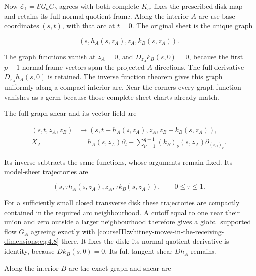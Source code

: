 Now \(\mathcal E_1=\mathcal E G_aG_b\) agrees with both complete \(K_c\), fixes the prescribed disk map and retains its full normal quotient frame. Along the interior \(A\)-arc use base coordinates \((s,t)\), with that arc at \(t=0\). The original sheet is the unique graph

\begin{equation}
(s,h_A(s,z_A),z_A,k_B(s,z_A)).
 \label{courseIII:whitney-moves-in-the-receiving-dimensions:eq:4.7}
\end{equation}

The graph functions vanish at \(z_A=0\), and \(D_{z_A}k_B(s,0)=0\), because the first \(p-1\) normal frame vectors span the projected \(A\) directions. The full derivative \(D_{z_A}h_A(s,0)\) is retained. The inverse function theorem gives this graph uniformly along a compact interior arc. Near the corners every graph function vanishes as a germ because those complete sheet charts already match.

The full graph shear and its vector field are

\begin{equation}
\begin{aligned}
 (s,t,z_A,z_B)&\longmapsto
      (s,t+h_A(s,z_A),z_A,z_B+k_B(s,z_A)),\\
 X_A&=h_A(s,z_A)\partial_t+
       \sum_{\nu=1}^{q-1}(k_B)_\nu(s,z_A)\partial_{(z_B)_\nu}.
 \end{aligned}
 \label{courseIII:whitney-moves-in-the-receiving-dimensions:eq:4.8}
\end{equation}

Its inverse subtracts the same functions, whose arguments remain fixed. Its model-sheet trajectories are

\begin{equation}
(s,\tau h_A(s,z_A),z_A,\tau k_B(s,z_A)),\qquad 0\leq\tau\leq1.
 \label{courseIII:whitney-moves-in-the-receiving-dimensions:eq:4.9}
\end{equation}

For a sufficiently small closed transverse disk these trajectories are compactly contained in the required arc neighbourhood. A cutoff equal to one near their union and zero outside a larger neighbourhood therefore gives a global supported flow \(G_A\) agreeing exactly with \eqref{courseIII:whitney-moves-in-the-receiving-dimensions:eq:4.8} there. It fixes the disk; its normal quotient derivative is identity, because \(Dk_B(s,0)=0\). Its full tangent shear \(Dh_A\) remains.

Along the interior \(B\)-arc the exact graph and shear are

